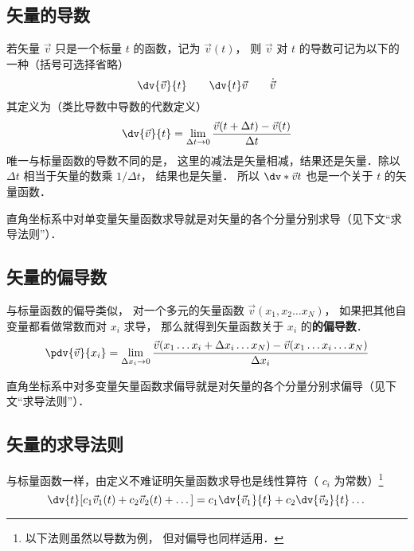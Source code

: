 

\subsection{矢量的导数}

若矢量 $\vec v$ 只是一个标量 $t$ 的函数，记为 $\vec v(t)$， 则 $\vec v$ 对 $t$ 的导数可记为以下的一种（括号可选择省略）
\begin{equation}
\dv{\vec v}{t} \qquad \dv{t}\vec v \qquad \dot{\vec v}
\end{equation}
其定义为（类比导数中导数的代数定义）
\begin{equation}
\dv{\vec v}{t} = \lim_{\Delta t \to 0} \frac{\vec v ( t + \Delta t) - \vec v(t)}{\Delta t}
\end{equation}
唯一与标量函数的导数不同的是， 这里的减法是矢量相减，结果还是矢量．除以 $\Delta t$ 相当于矢量的数乘 $1/\Delta t$， 结果也是矢量． 所以 $\dv*{\vec v}{t}$ 也是一个关于 $t$ 的矢量函数．

直角坐标系中对单变量矢量函数求导就是对矢量的各个分量分别求导（见下文“求导法则”）．

\subsection{矢量的偏导数}
与标量函数的偏导类似， 对一个多元的矢量函数 $\vec v(x_1, x_2\ldots x_N)$， 如果把其他自变量都看做常数而对 $x_i$ 求导， 那么就得到矢量函数关于 $x_i$ 的\textbf{的偏导数}．
\begin{equation}
\pdv{\vec v}{x_i} = \lim_{\Delta x_i \to 0} \frac{\vec v(x_1 \ldots x_i+\Delta x_i\ldots x_N) -  \vec v(x_1 \ldots x_i\ldots x_N)}{\Delta x_i}
\end{equation}

直角坐标系中对多变量矢量函数求偏导就是对矢量的各个分量分别求偏导（见下文“求导法则”）．

\subsection{矢量的求导法则}
与标量函数一样，由定义不难证明矢量函数求导也是线性算符（ $c_i$ 为常数）\footnote{以下法则虽然以导数为例， 但对偏导也同样适用．}
\begin{equation}
\dv{t}[c_1 \vec v_1(t) + c_2 \vec v_2(t) + \dots] = c_1\dv{\vec v_1}{t} + c_2\dv{\vec v_2}{t} \dots
\end{equation}

